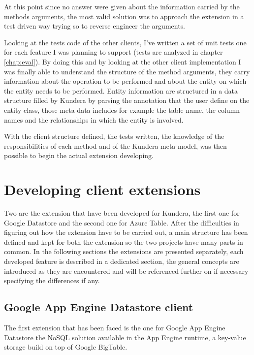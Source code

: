 \newparagraph At this point since no answer were given about the information carried by the methods arguments, the most valid solution was to approach the extension in a test driven way trying so to reverse engineer the arguments.

\noindent Looking at the tests code of the other clients, I've written a set of unit tests one for each feature I was planning to support (tests are analyzed in chapter \ref{chap:eval}).
By doing this and by looking at the other client implementation I was finally able to understand the structure of the method arguments, they carry information about the operation to be performed and about the entity on which the entity needs to be performed.
Entity information are structured in a data structure filled by Kundera by parsing the annotation that the user define on the entity class, those meta-data includes for example the table name, the column names and the relationships in which the entity is involved.

\noindent With the client structure defined, the tests written, the knowledge of the responsibilities of each method and of the Kundera meta-model, was then possible to begin the actual extension developing.

\section{Developing client extensions}
Two are the extension that have been developed for Kundera, the first one for Google Datastore and the second one for Azure Table.
After the difficulties in figuring out how the extension have to be carried out, a main structure has been defined and kept for both the extension so the two projects have many parts in common. 
In the following sections the extensions are presented separately, each developed feature is described in a dedicated section, the general concepts are introduced as they are encountered and will be referenced further on if necessary specifying the differences if any.

\subsection{Google App Engine Datastore client}
\label{sec:kundera-datastore}
The first extension that has been faced is the one for Google App Engine Datastore \cite{online:datastore} the NoSQL solution available in the App Engine runtime, a key-value storage build on top of Google BigTable.

